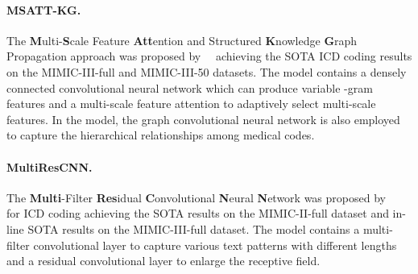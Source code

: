 \documentclass{article}
\begin{document}
\paragraph{MSATT-KG.} The \textbf{M}ulti-\textbf{S}cale Feature \textbf{Att}ention and Structured \textbf{K}nowledge \textbf{G}raph Propagation approach was proposed by~\citeauthor{xie2019ehr}~ achieving the SOTA ICD coding results on the MIMIC-III-full and MIMIC-III-50 datasets. The model contains a densely connected convolutional neural network which can produce variable -gram features and a multi-scale feature attention to adaptively select multi-scale features. In the model, the graph convolutional neural network \cite{KipfW16} is also employed to capture the hierarchical relationships among medical codes. 

\paragraph{MultiResCNN.} The \textbf{Multi}-Filter \textbf{Res}idual \textbf{C}onvolutional \textbf{N}eural \textbf{N}etwork was proposed by~\citeauthor{li2020multirescnn}~ for ICD coding achieving the SOTA results on the MIMIC-II-full dataset and in-line SOTA results on the MIMIC-III-full dataset. The model contains a multi-filter convolutional layer to capture various text patterns with different lengths and a residual convolutional layer to enlarge the receptive field.
\end{document}

